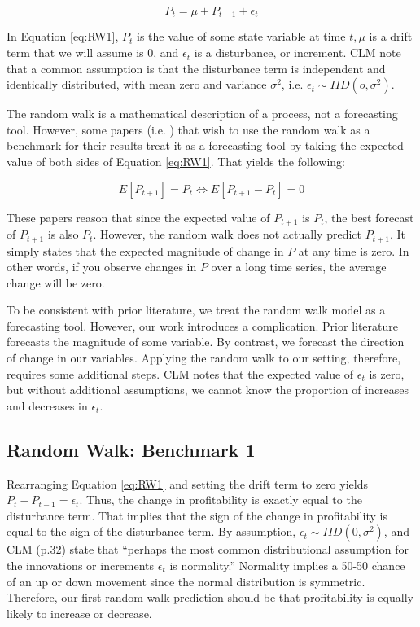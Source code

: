 \begin{equation}
\label{eq:RW1}
P_t = \mu + P_{t-1} + \epsilon_t 
\end{equation}

\noindent In Equation \ref{eq:RW1}, \(P_t\) is the value of some state variable at time \(t, \mu\) is a drift term that we will assume is 0, and \(\epsilon_t\) is a disturbance, or increment.  CLM note that a common assumption is that the disturbance term is independent and identically distributed, with mean zero and variance \(\sigma^2\),  i.e.  \( \epsilon_t \sim IID(o,\sigma^2)\). 

The random walk is a mathematical description of a process, not a forecasting tool. However, some papers (i.e.  \cite{Bradshaw}) that wish to use the random walk as a benchmark for their results treat it as a forecasting tool by taking the expected value of both sides of Equation  \ref{eq:RW1}. That yields the following:

\begin{equation}
\label{eq:RW2}
E[P_{t+1}] = P_t \Leftrightarrow E[P_{t+1} - P_t] = 0
\end{equation}

\noindent These papers reason that since the expected value of \(P_{t+1}\) is \(P_t\), the best forecast of \(P_{t+1}\) is also \(P_t\). However, the random walk does not actually predict \(P_{t+1}\). It simply states that the expected magnitude of change in \(P\) at any time is zero. In other words, if you observe changes in \(P\) over a long time series, the average change will be zero.

To be consistent with prior literature, we treat the random walk model as a forecasting tool. However, our work introduces a complication. Prior literature forecasts the magnitude of some variable. By contrast, we forecast the direction of change in our variables. Applying the random walk to our setting, therefore, requires some additional steps. CLM notes that the expected value of \(\epsilon_t\) is zero, but without additional assumptions, we cannot know the proportion of increases and decreases in \(\epsilon_t\).

\subsection{Random Walk: Benchmark 1}

Rearranging Equation \ref{eq:RW1} and setting the drift term to zero yields \(P_t - P_{t-1} = \epsilon_t\). Thus, the change in profitability is exactly equal to the disturbance term. That implies that the sign of the change in profitability is equal to the sign of the disturbance term. By assumption,  \(\epsilon_t \sim IID(0,\sigma^2)\), and CLM (p.32) state that “perhaps the most common distributional assumption for the innovations or increments \(\epsilon_t\) is normality.” Normality implies a 50-50 chance of an up or down movement since the normal distribution is symmetric. Therefore, our first random walk prediction should be that profitability is equally likely to increase or decrease.

